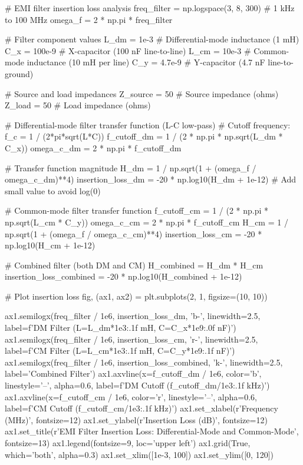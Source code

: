 \documentclass[11pt,a4paper]{article}
\begin{document}
\begin{pycode}
# EMI filter insertion loss analysis
freq_filter = np.logspace(3, 8, 300)  # 1 kHz to 100 MHz
omega_f = 2 * np.pi * freq_filter

# Filter component values
L_dm = 1e-3  # Differential-mode inductance (1 mH)
C_x = 100e-9  # X-capacitor (100 nF line-to-line)
L_cm = 10e-3  # Common-mode inductance (10 mH per line)
C_y = 4.7e-9  # Y-capacitor (4.7 nF line-to-ground)

# Source and load impedances
Z_source = 50  # Source impedance (ohms)
Z_load = 50  # Load impedance (ohms)

# Differential-mode filter transfer function (L-C low-pass)
# Cutoff frequency: f_c = 1 / (2*pi*sqrt(L*C))
f_cutoff_dm = 1 / (2 * np.pi * np.sqrt(L_dm * C_x))
omega_c_dm = 2 * np.pi * f_cutoff_dm

# Transfer function magnitude
H_dm = 1 / np.sqrt(1 + (omega_f / omega_c_dm)**4)
insertion_loss_dm = -20 * np.log10(H_dm + 1e-12)  # Add small value to avoid log(0)

# Common-mode filter transfer function
f_cutoff_cm = 1 / (2 * np.pi * np.sqrt(L_cm * C_y))
omega_c_cm = 2 * np.pi * f_cutoff_cm
H_cm = 1 / np.sqrt(1 + (omega_f / omega_c_cm)**4)
insertion_loss_cm = -20 * np.log10(H_cm + 1e-12)

# Combined filter (both DM and CM)
H_combined = H_dm * H_cm
insertion_loss_combined = -20 * np.log10(H_combined + 1e-12)

# Plot insertion loss
fig, (ax1, ax2) = plt.subplots(2, 1, figsize=(10, 10))

ax1.semilogx(freq_filter / 1e6, insertion_loss_dm, 'b-', linewidth=2.5, label=f'DM Filter (L={L_dm*1e3:.1f} mH, C={C_x*1e9:.0f} nF)')
ax1.semilogx(freq_filter / 1e6, insertion_loss_cm, 'r-', linewidth=2.5, label=f'CM Filter (L={L_cm*1e3:.1f} mH, C={C_y*1e9:.1f} nF)')
ax1.semilogx(freq_filter / 1e6, insertion_loss_combined, 'k-', linewidth=2.5, label='Combined Filter')
ax1.axvline(x=f_cutoff_dm / 1e6, color='b', linestyle='--', alpha=0.6, label=f'DM Cutoff ({f_cutoff_dm/1e3:.1f} kHz)')
ax1.axvline(x=f_cutoff_cm / 1e6, color='r', linestyle='--', alpha=0.6, label=f'CM Cutoff ({f_cutoff_cm/1e3:.1f} kHz)')
ax1.set_xlabel(r'Frequency (MHz)', fontsize=12)
ax1.set_ylabel(r'Insertion Loss (dB)', fontsize=12)
ax1.set_title(r'EMI Filter Insertion Loss: Differential-Mode and Common-Mode', fontsize=13)
ax1.legend(fontsize=9, loc='upper left')
ax1.grid(True, which='both', alpha=0.3)
ax1.set_xlim([1e-3, 100])
ax1.set_ylim([0, 120])


\end{pycode}
\end{document}

